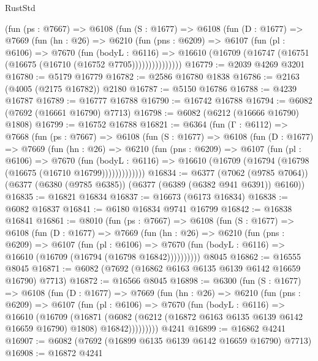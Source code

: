 \begin{lexlean}{RustStd}
\begin{coremodule}
        (fun (ps : @7667) =>
        @6108
          (fun (S : @1677) =>
          @6108
            (fun (D : @1677) =>
            @7669
              (fun (hn : @26) =>
              @6210
                (fun (pns : @6209) =>
                @6107
                  (fun (pl : @6106) =>
                  @7670
                    (fun (bodyL : @6116) =>
                    @16610 (@16709 (@16747 (@16751 (@16675 (@16710 (@16752 @7705)))))))))))))))
@16779 := @2039 @4269 @3201
@16780 := @5179 @16779
@16782 := @2586 @16780 @1838
@16786 := @2163 (@4005 (@2175 @16782)) @2180
@16787 := @5150 @16786
@16788 := @4239 @16787
@16789 := @16777 @16788
@16790 := @16742 @16788
@16794 := @6082 (@7692 (@16661 @16790) @7713)
@16798 := @6082 (@6212 (@16666 @16790) @1808)
@16799 := @16752 @16788
@16821 := @6364
    (fun (Γ : @6112) =>
    @7668
      (fun (ps : @7667) =>
      @6108
        (fun (S : @1677) =>
        @6108
          (fun (D : @1677) =>
          @7669
            (fun (hn : @26) =>
            @6210
              (fun (pns : @6209) =>
              @6107
                (fun (pl : @6106) =>
                @7670
                  (fun (bodyL : @6116) =>
                  @16610 (@16709 (@16794 (@16798 (@16675 (@16710 @16799)))))))))))))
@16834 := @6377
    (@7062 (@9785 @7064))
    (@6377 (@6380 (@9785 @6385)) (@6377 (@6389 (@6382 @941 @6391)) @6160))
@16835 := @16821 @16834
@16837 := @16673 (@6173 @16834)
@16838 := @6082 @16837
@16841 := @6180 @16834 @9741 @16799
@16842 := @16838 @16841
@16861 := @8010
    (fun (ps : @7667) =>
    @6108
      (fun (S : @1677) =>
      @6108
        (fun (D : @1677) =>
        @7669
          (fun (hn : @26) =>
          @6210
            (fun (pns : @6209) =>
            @6107
              (fun (pl : @6106) =>
              @7670 (fun (bodyL : @6116) => @16610 (@16709 (@16794 (@16798 @16842))))))))))
    @8045
@16862 := @16555 @8045
@16871 := @6082 (@7692 (@16862 @6163 @6135 @6139 @6142 @16659 @16790) @7713)
@16872 := @16566 @8045
@16898 := @6300
    (fun (S : @1677) =>
    @6108
      (fun (D : @1677) =>
      @7669
        (fun (hn : @26) =>
        @6210
          (fun (pns : @6209) =>
          @6107
            (fun (pl : @6106) =>
            @7670
              (fun (bodyL : @6116) =>
              @16610
                (@16709
                  (@16871
                    (@6082
                      (@6212 (@16872 @6163 @6135 @6139 @6142 @16659 @16790) @1808)
                      @16842)))))))))
    @4241
@16899 := @16862 @4241
@16907 := @6082 (@7692 (@16899 @6135 @6139 @6142 @16659 @16790) @7713)
@16908 := @16872 @4241

\end{coremodule}
\end{lexlean}
